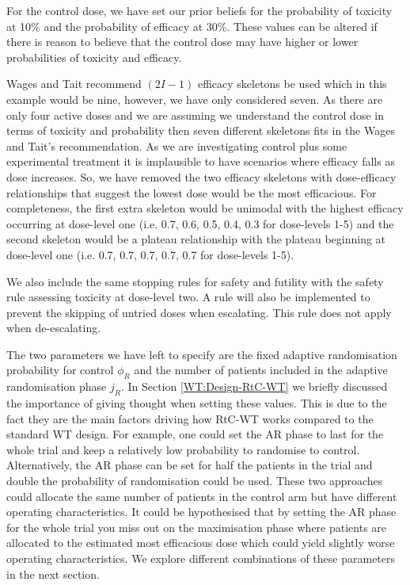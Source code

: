 For the control dose, we have set our prior beliefs for the probability of toxicity at 10\% and the probability of efficacy at 30\%. These values can be altered if there is reason to believe that the control dose may have higher or lower probabilities of toxicity and efficacy. 

Wages and Tait recommend $(2I-1)$ efficacy skeletons be used which in this example would be nine, however, we have only considered seven. As there are only four active doses and we are assuming we understand the control dose in terms of toxicity and probability then seven different skeletons fits in the Wages and Tait's recommendation. As we are investigating control plus some experimental treatment it is implausible to have scenarios where efficacy falls as dose increases. So, we have removed the two efficacy skeletons with dose-efficacy relationships that suggest the lowest dose would be the most efficacious. For completeness, the first extra skeleton would be unimodal with the highest efficacy occurring at dose-level one (i.e. 0.7, 0.6, 0.5, 0.4, 0.3 for dose-levels 1-5) and the second skeleton would be a plateau relationship with the plateau beginning at dose-level one (i.e. 0.7, 0.7, 0.7, 0.7, 0.7 for dose-levels 1-5). 

We also include the same stopping rules for safety and futility with the safety rule assessing toxicity at dose-level two. A rule will also be implemented to prevent the skipping of untried doses when escalating. This rule does not apply when de-escalating. 

The two parameters we have left to specify are the fixed adaptive randomisation probability for control $\phi_R$ and the number of patients included in the adaptive randomisation phase $j_R$. In Section \ref{WT:Design-RtC-WT} we briefly discussed the importance of giving thought when setting these values. This is due to the fact they are the main factors driving how RtC-WT works compared to the standard WT design. For example, one could set the AR phase to last for the whole trial and keep a relatively low probability to randomise to control. Alternatively, the AR phase can be set for half the patients in the trial and double the probability of randomisation could be used. These two approaches could allocate the same number of patients in the control arm but have different operating characteristics. It could be hypothesised that by setting the AR phase for the whole trial you miss out on the maximisation phase where patients are allocated to the estimated most efficacious dose which could yield slightly worse operating characteristics. We explore different combinations of these parameters in the next section. 


